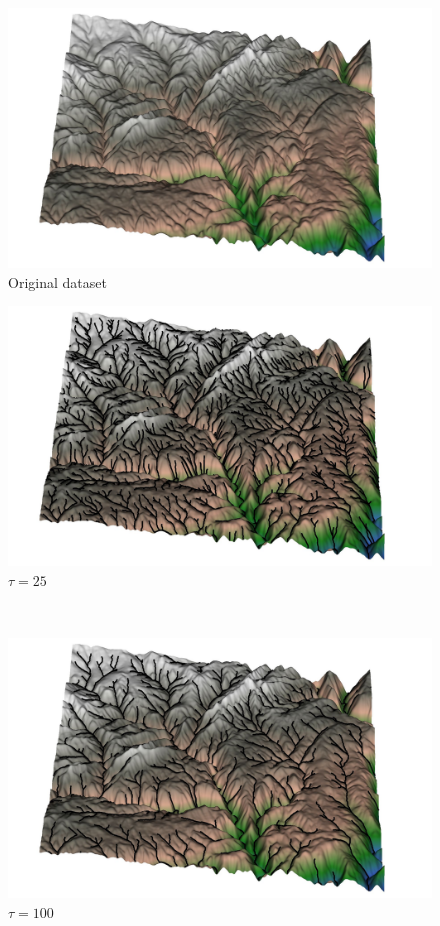 \begin{figure}[t]
\begin{center}
  \begin{minipage}{0.49\linewidth} \includegraphics[width=0.99\linewidth]{images/mtn2_original.jpg} \\ \centering Original dataset \end{minipage}
  \begin{minipage}{0.49\linewidth} \includegraphics[width=0.99\linewidth]{images/mtn2_T25.jpg} \\ \centering $\tau = 25$ \end{minipage} \\
  \begin{minipage}{0.49\linewidth} \includegraphics[width=0.99\linewidth]{images/mtn2_T100.jpg}\\ \centering $\tau = 100$ \end{minipage}

\end{center}
\end{figure}
